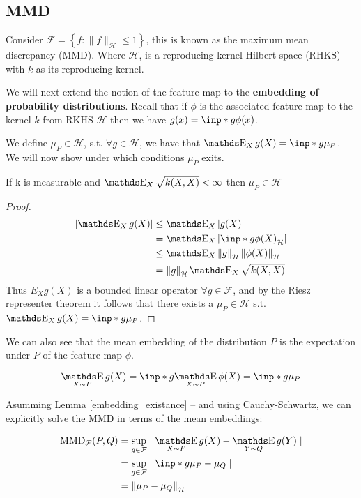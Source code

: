 \subsection{MMD}

Consider $\mathcal{F}=\left\{f:\|f\|_{\mathcal{H}} \leq 1\right\}$, this is known
as the maximum mean discrepancy (MMD). Where $\mathcal{H}$, is a reproducing kernel Hilbert space 
(RHKS) with $k$ as its reproducing kernel. 

We will next extend the notion of the feature map to the \textbf{embedding of probability distributions}. 
Recall that if $\phi$ is the associated feature map to the kernel $k$ from 
RKHS $\mathcal{H}$ then we have $g(x) = \inp*{g}{\phi(x)}$.

We define $\mu_P \in \mathcal{H}$, s.t. $\forall g \in \mathcal{H}$, we have that
$\mathop{\E}_{X} g(X) = \inp*{g}{\mu_P}$. We will now show under which conditions $\mu_P$ exits.

\begin{lemma}\label{embedding_existance}
    If k is measurable and $\mathop{\E}_{X} \sqrt{k(X, X)} < \infty$ then
    $\mu_P \in \mathcal{H}$
\end{lemma}

\begin{proof}
\begin{align*}
    \left|\E_{X} g(X)\right| &\leq 
    \E_{X}|g(X)| \\
    &=
    \E_{X}\left| \inp*{g}{\phi(X)}_{\mathcal{H}}\right| \\
    &\leq
    \E_{X} \norm{g}_{\mathcal{H}} \norm{\phi(X)}_{\mathcal{H}} \\
    &= \norm{g}_{\mathcal{H}} \E_{X} \sqrt{k(X, X)}
\end{align*}
Thus $E_{X} g(X)$ is a bounded linear operator $\forall g \in \mathcal{F}$, and by the
Riesz representer theorem it follows that there exists a $\mu_P \in \mathcal{H}$
s.t. $\mathop{\E}_{X} g(X) = \inp*{g}{\mu_P}$. 
\end{proof}


We can also see that the mean embedding of the distribution $P$ is the expectation under $P$
of the feature map $\phi$.

$$
    \mathop{\E}_{X \sim P} g(X) = 
     \inp*{g}{ \mathop{\E}_{X \sim P} \phi(X)} = \inp*{g}{\mu_P}
$$

Asumming Lemma \ref{embedding_existance} -- and using Cauchy-Schwartz, 
we can explicitly solve the MMD in terms of the mean embeddings:

\begin{align*} 
    \text{MMD}_\mathcal{F} (P, Q) 
    &= 
    \sup _{g \in \mathcal{F}} \mid \mathop{\E}_{X \sim P} g(X) - \mathop{\E}_{Y \sim Q} g(Y) \mid \\
    &= 
    \sup _{g \in \mathcal{F}} \mid \inp*{g}{\mu_P - \mu_Q} \mid \\
    &=
    \norm{\mu_P - \mu_Q}_\mathcal{H}
\end{align*}

